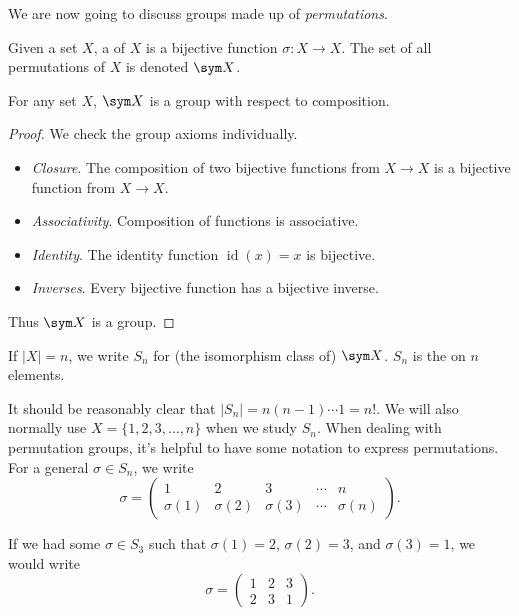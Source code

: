 
We are now going to discuss groups made up of \emph{permutations}.

\begin{definition}[Permutations]
	Given a set $X$, a  of $X$ is a bijective function $\sigma: X \rightarrow X$. The set of all permutations of $X$ is denoted $\sym X$.
\end{definition}

\begin{theorem}
	For any set $X$, $\sym X$ is a group with respect to composition. 
\end{theorem}
\begin{proof}
	We check the group axioms individually.
	\begin{itemize}
		\item \emph{Closure}. The composition of two bijective functions from $X \rightarrow X$ is a bijective function from $X \rightarrow X$.
		\item \emph{Associativity}. Composition of functions is associative.
		\item \emph{Identity}. The identity function $\operatorname{id}(x) = x$ is bijective.
		\item \emph{Inverses}. Every bijective function has a bijective inverse.
	\end{itemize}
	Thus $\sym X$ is a group.
\end{proof}

\begin{definition}
	If $|X| = n$, we write $S_n$ for (the isomorphism class of) $\sym X$. $S_n$ is the  on $n$ elements.
\end{definition}

It should be reasonably clear that $|S_n| = n(n - 1) \cdots 1 = n!$. We will also normally use $X = \{1, 2, 3, \dots, n \}$ when we study $S_n$. When dealing with permutation groups, it's helpful to have some notation to express permutations. For a general $\sigma \in S_n$, we write
$$
\sigma = \begin{pmatrix}
	1 & 2 & 3 & \cdots & n \\
	\sigma(1) & \sigma(2) & \sigma(3) & \cdots & \sigma(n)
\end{pmatrix}.
$$

\begin{example}
	If we had some $\sigma \in S_3$ such that $\sigma(1) = 2$, $\sigma(2) = 3$, and $\sigma(3) = 1$, we would write
	$$
\sigma = \begin{pmatrix}
	1 & 2 & 3 \\
	2 & 3 & 1
\end{pmatrix}.
$$
\end{example}

